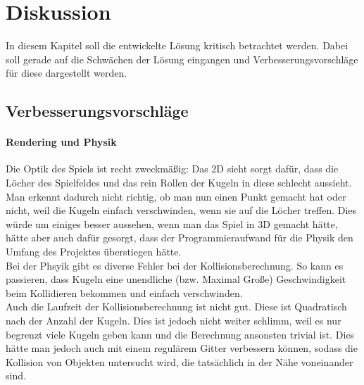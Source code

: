 \chapter{Diskussion}
In diesem Kapitel soll die entwickelte Lösung kritisch betrachtet werden. Dabei soll gerade auf die Schwächen der Lösung eingangen und Verbesserungsvorschläge für diese dargestellt werden.



\section{Verbesserungsvorschläge}

\subsubsection{Rendering und Physik}
Die Optik des Spiels ist recht zweckmäßig: Das 2D sieht sorgt dafür, dass die Löcher des Spielfeldes und das  rein Rollen der Kugeln in diese schlecht aussieht. Man erkennt dadurch nicht richtig, ob man nun einen Punkt gemacht hat oder nicht, weil die Kugeln einfach verschwinden, wenn sie auf die Löcher treffen. Dies würde um einiges besser aussehen, wenn man das Spiel in 3D gemacht hätte, hätte aber auch dafür gesorgt, dass der Programmieraufwand für die Physik den Umfang des Projektes überstiegen hätte. \\
Bei der Phsyik gibt es diverse Fehler bei der Kollisionsberechnung. So kann es passieren, dass Kugeln eine unendliche (bzw. Maximal Große) Geschwindigkeit beim Kollidieren bekommen und einfach verschwinden. \\
Auch die Laufzeit der Kollisionsberechnung ist nicht gut. Diese ist Quadratisch nach der Anzahl der Kugeln. Dies ist jedoch nicht weiter schlimm, weil es nur begrenzt viele Kugeln geben kann und die Berechnung ansonsten trivial ist. Dies hätte man jedoch auch mit einem regulärem Gitter verbessern können, sodass die Kollision von Objekten untersucht wird, die tatsächlich in der Nähe voneinander sind.
